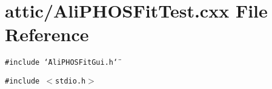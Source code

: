 \section{attic/Ali\-PHOSFit\-Test.cxx File Reference}
\label{AliPHOSFitTest_8cxx}
{\tt \#include \char`\"{}Ali\-PHOSFit\-Gui.h\char`\"{}}\par
{\tt \#include $<$stdio.h$>$}\par
